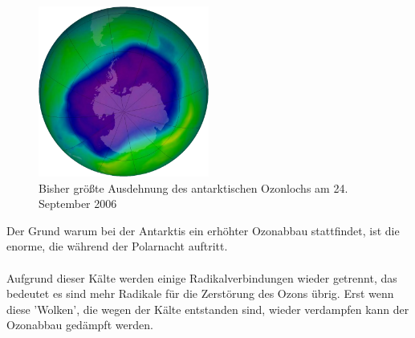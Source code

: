 \documentclass[11pt, a4paper]{article}
\begin{document}
\begin{figure}[h!]
	\centering
	\includegraphics[width=0.5\textwidth]{images/ozonloch}
	\caption{Bisher größte Ausdehnung des antarktischen Ozonlochs am 24. September 2006}
\end{figure}

Der Grund warum bei der Antarktis ein erhöhter Ozonabbau stattfindet, ist die enorme, die während der Polarnacht auftritt. \\ \\Aufgrund dieser Kälte werden einige Radikalverbindungen wieder getrennt, das bedeutet es sind mehr Radikale für die Zerstörung des Ozons übrig. Erst wenn diese 'Wolken', die wegen der Kälte entstanden sind, wieder verdampfen kann der Ozonabbau gedämpft werden. 
\newpage
\nocite{*}

{}
\end{document}
